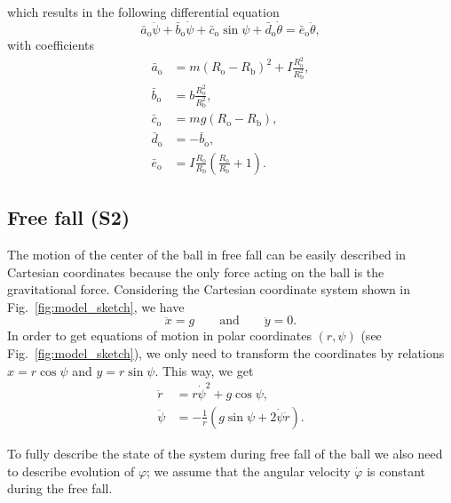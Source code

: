 \documentclass{ifacconf}
\begin{document}
which results in the following differential equation
\begin{equation}
  \bar{a}_\mathrm{o}\ddot{\psi} + \bar{b}_\mathrm{o}\dot{\psi} + \bar{c}_\mathrm{o}\sin\psi + \bar{d}_\mathrm{o}\dot{\theta} = \bar{e}_\mathrm{o}\ddot{\theta},
\end{equation}
with coefficients
\begin{subequations}
  \begin{align}
    \bar{a}_\mathrm{o} &= m \left(R_\mathrm{o}-R_\mathrm{b}\right)^2 + I \frac{R_\mathrm{o}^2}{R_\mathrm{b}^2}, \\
    \bar{b}_\mathrm{o} &= b  \frac{R_\mathrm{o}^2}{R_\mathrm{b}^2}, \\
    \bar{c}_\mathrm{o} &= m g \left(R_\mathrm{o}-R_\mathrm{b}\right), \\
    \bar{d}_\mathrm{o} &= -\bar{b}_\mathrm{o}, \\
    \bar{e}_\mathrm{o} &= I \frac{R_\mathrm{o}}{R_\mathrm{b}}\left( \frac{R_\mathrm{o}}{R_\mathrm{b}} + 1 \right).
  \end{align}
\end{subequations}

\subsection{Free fall (S2)} %
\label{sub:free_fall}
The motion of the center of the ball in free fall can be easily described in Cartesian coordinates because the only force acting on the ball is the gravitational force. Considering the Cartesian coordinate system shown in Fig.~\ref{fig:model_sketch}, we have 
\begin{equation}
  \ddot{x} = g
  \qquad \mathrm{and} \qquad
  \ddot{y} = 0.
\end{equation}
In order to get equations of motion in polar coordinates $(r,\psi)$ (see Fig.~\ref{fig:model_sketch}), we only need to transform the coordinates by relations $x=r\cos\psi$ and $y=r\sin\psi$. This way, we get
\begin{subequations}
  \begin{align}
    \ddot{r} &= r\dot{\psi}^2 + g\cos\psi, \\
    \ddot{\psi} &= -\frac{1}{r}\left(g\sin\psi + 2\dot{\psi}\dot{r}\right).
  \end{align}
\end{subequations}

To fully describe the state of the system during free fall of the ball we also need to describe evolution of $\varphi$; we assume that the angular velocity $\dot{\varphi}$ is constant during the free fall.
\end{document}
